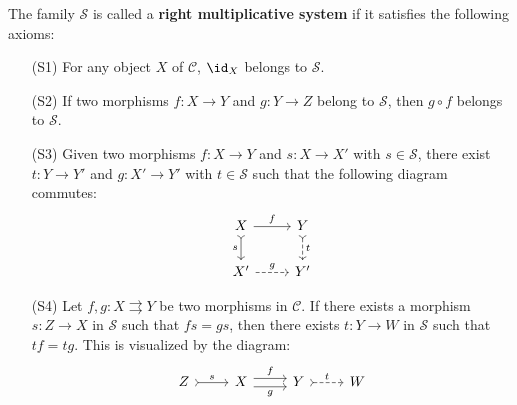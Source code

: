 \begin{definition}
The family $\mathcal{S}$ is called a \textbf{right multiplicative system} if it satisfies the following axioms:
\begin{enumerate}[leftmargin=40pt]
    \item[(S1)] For any object $X$ of $\mathcal{C}$, $\id_X$ belongs to $\mathcal{S}$.
    \item[(S2)] If two morphisms $f:X\to Y$ and $g:Y\to Z$ belong to $\mathcal{S}$, then $g\circ f$ belongs to $\mathcal{S}$.
    \item[(S3)] Given two morphisms $f:X\to Y$ and $s:X\to X'$ with $s\in\mathcal{S}$, there exist $t:Y\to Y'$ and $g:X'\to Y'$ with $t\in\mathcal{S}$ such that the following diagram commutes:
    \[\begin{tikzcd}
    X\ar[r,"f"]\ar[d,swap,"s",tail]&Y\ar[d,dashed,"t",tail]\\
    X'\ar[r,dashed,"g"]&Y'
    \end{tikzcd}\]
    \item[(S4)] Let $f,g:X\rightrightarrows Y$ be two morphisms in $\mathcal{C}$. If there exists a morphism $s:Z\to X$ in $\mathcal{S}$ such that $fs=gs$, then there exists $t:Y\to W$ in $\mathcal{S}$ such that $tf=tg$. This is visualized by the diagram:
    \[\begin{tikzcd}
    Z\ar[r,"s",tail]&X\ar[r,shift left=3pt,"f"]\ar[r,shift right=3pt,swap,"g"]&Y\ar[r,dashed,"t",tail]&W
    \end{tikzcd}\]
\end{enumerate}
\end{definition}

